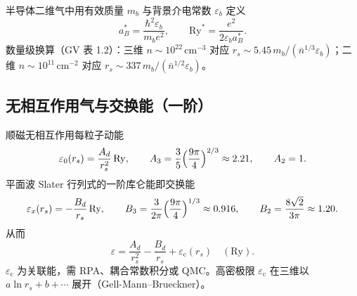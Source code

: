 半导体二维气中用有效质量 $m_b$ 与背景介电常数 $\varepsilon_b$ 定义
\begin{equation}
  a_B^*=\frac{\hbar^2\varepsilon_b}{m_b e^2},
  \qquad
  \mathrm{Ry}^*=\frac{e^2}{2\varepsilon_b a_B^*}.
\end{equation}
数量级换算（GV 表 1.2）：三维 $n\sim10^{22}\,\mathrm{cm}^{-3}$ 对应 $r_s\sim5.45\,m_b/(\bar n^{1/3}\varepsilon_b)$；二维 $n\sim10^{11}\,\mathrm{cm}^{-2}$ 对应 $r_s\sim337\,m_b/(\bar n^{1/2}\varepsilon_b)$。

\subsection{无相互作用气与交换能（一阶）}

顺磁无相互作用每粒子动能
\begin{equation}
  \varepsilon_0(r_s)
  =\frac{A_d}{r_s^2}\,\mathrm{Ry},
  \qquad
  A_3=\frac35\Bigl(\frac{9\pi}{4}\Bigr)^{2/3}\approx2.21,
  \qquad
  A_2=1.
\end{equation}
平面波 Slater 行列式的一阶库仑能即交换能
\begin{equation}
  \varepsilon_x(r_s)
  =-\frac{B_d}{r_s}\,\mathrm{Ry},
  \qquad
  B_3=\frac{3}{2\pi}\Bigl(\frac{9\pi}{4}\Bigr)^{1/3}\approx0.916,
  \qquad
  B_2=\frac{8\sqrt{2}}{3\pi}\approx1.20.
\label{eq:ex_Bd}
\end{equation}
从而
\begin{equation}
  \varepsilon
  =\frac{A_d}{r_s^2}-\frac{B_d}{r_s}+\varepsilon_{\mathrm{c}}(r_s)
  \quad(\mathrm{Ry}).
\label{eq:eps_rs}
\end{equation}
$\varepsilon_{\mathrm{c}}$ 为关联能，需 RPA、耦合常数积分或 QMC。高密极限 $\varepsilon_{\mathrm{c}}$ 在三维以 $a\ln r_s+b+\cdots$ 展开（Gell-Mann--Brueckner）。
